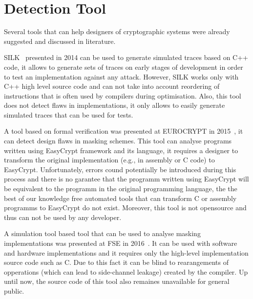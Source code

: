 \section{Detection Tool}\label{sec:tool}

Several tools that can help designers of cryptographic systems
were already suggested and discussed in literature.

SILK~\cite{DBLP:conf/acsac/Veshchikov14} presented in 2014
can be used to generate simulated traces based on C++ code, it allows
to generate sets of traces on early stages of development in order to test an implementation
against any attack. However, SILK works only with C++ high level source code and 
can not take into account reordering of instructions that is often used by compilers during
optimisation. Also, this tool does not detect flaws in implementations, 
it only allows to easily generate simulated traces that can be used for tests.

A tool based on formal verification 
was presented at EUROCRYPT in 2015~\cite{DBLP:conf/eurocrypt/BartheBDFGS15},
it can detect design flaws in masking schemes.
This tool can analyse programs written using EasyCrypt framework and its language,
it requires a designer to transform the original implementation (e.g., in assembly or C code)
to EasyCrypt. Unfortunately, errors cound potentially be introduced during this process
and there is no garantee that the programm written using EasyCrypt will be equivalent
to the programm in the original programming language, the the best of our knowledge
free automated tools that can transform C or assembly programms to EasyCrypt do not exist.
Moreover, this tool is not opensource and thus can not be used by any developer.

A simulation tool based tool that can be used to analyse masking implementations
was presented at FSE in 2016~\cite{DBLP:conf/fse/Reparaz16}.
It can be used with software and hardware implementations
and it requires only the high-level implementation source code such as C.
Due to this fact it can be blind to rearangements of opperations 
(which can lead to side-channel leakage) created by the compiler.
Up until now, the source code of this tool also remaines unavailable for general public.




